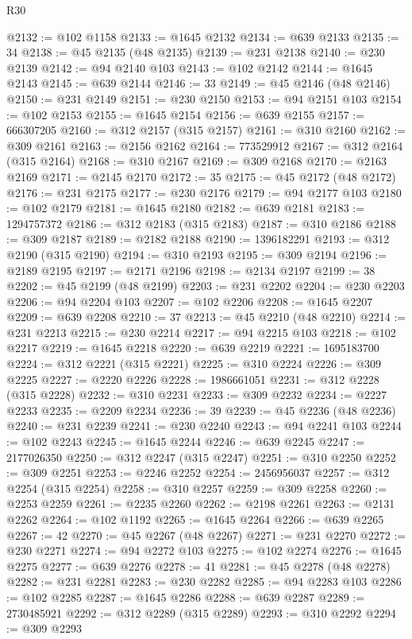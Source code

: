 \begin{lexlean}{R30}
\begin{coremodule}
@2132 := @102 @1158
@2133 := @1645 @2132
@2134 := @639 @2133
@2135 := 34
@2138 := @45 @2135 (@48 @2135)
@2139 := @231 @2138
@2140 := @230 @2139
@2142 := @94 @2140 @103
@2143 := @102 @2142
@2144 := @1645 @2143
@2145 := @639 @2144
@2146 := 33
@2149 := @45 @2146 (@48 @2146)
@2150 := @231 @2149
@2151 := @230 @2150
@2153 := @94 @2151 @103
@2154 := @102 @2153
@2155 := @1645 @2154
@2156 := @639 @2155
@2157 := 666307205
@2160 := @312 @2157 (@315 @2157)
@2161 := @310 @2160
@2162 := @309 @2161
@2163 := @2156 @2162
@2164 := 773529912
@2167 := @312 @2164 (@315 @2164)
@2168 := @310 @2167
@2169 := @309 @2168
@2170 := @2163 @2169
@2171 := @2145 @2170
@2172 := 35
@2175 := @45 @2172 (@48 @2172)
@2176 := @231 @2175
@2177 := @230 @2176
@2179 := @94 @2177 @103
@2180 := @102 @2179
@2181 := @1645 @2180
@2182 := @639 @2181
@2183 := 1294757372
@2186 := @312 @2183 (@315 @2183)
@2187 := @310 @2186
@2188 := @309 @2187
@2189 := @2182 @2188
@2190 := 1396182291
@2193 := @312 @2190 (@315 @2190)
@2194 := @310 @2193
@2195 := @309 @2194
@2196 := @2189 @2195
@2197 := @2171 @2196
@2198 := @2134 @2197
@2199 := 38
@2202 := @45 @2199 (@48 @2199)
@2203 := @231 @2202
@2204 := @230 @2203
@2206 := @94 @2204 @103
@2207 := @102 @2206
@2208 := @1645 @2207
@2209 := @639 @2208
@2210 := 37
@2213 := @45 @2210 (@48 @2210)
@2214 := @231 @2213
@2215 := @230 @2214
@2217 := @94 @2215 @103
@2218 := @102 @2217
@2219 := @1645 @2218
@2220 := @639 @2219
@2221 := 1695183700
@2224 := @312 @2221 (@315 @2221)
@2225 := @310 @2224
@2226 := @309 @2225
@2227 := @2220 @2226
@2228 := 1986661051
@2231 := @312 @2228 (@315 @2228)
@2232 := @310 @2231
@2233 := @309 @2232
@2234 := @2227 @2233
@2235 := @2209 @2234
@2236 := 39
@2239 := @45 @2236 (@48 @2236)
@2240 := @231 @2239
@2241 := @230 @2240
@2243 := @94 @2241 @103
@2244 := @102 @2243
@2245 := @1645 @2244
@2246 := @639 @2245
@2247 := 2177026350
@2250 := @312 @2247 (@315 @2247)
@2251 := @310 @2250
@2252 := @309 @2251
@2253 := @2246 @2252
@2254 := 2456956037
@2257 := @312 @2254 (@315 @2254)
@2258 := @310 @2257
@2259 := @309 @2258
@2260 := @2253 @2259
@2261 := @2235 @2260
@2262 := @2198 @2261
@2263 := @2131 @2262
@2264 := @102 @1192
@2265 := @1645 @2264
@2266 := @639 @2265
@2267 := 42
@2270 := @45 @2267 (@48 @2267)
@2271 := @231 @2270
@2272 := @230 @2271
@2274 := @94 @2272 @103
@2275 := @102 @2274
@2276 := @1645 @2275
@2277 := @639 @2276
@2278 := 41
@2281 := @45 @2278 (@48 @2278)
@2282 := @231 @2281
@2283 := @230 @2282
@2285 := @94 @2283 @103
@2286 := @102 @2285
@2287 := @1645 @2286
@2288 := @639 @2287
@2289 := 2730485921
@2292 := @312 @2289 (@315 @2289)
@2293 := @310 @2292
@2294 := @309 @2293

\end{coremodule}
\end{lexlean}
